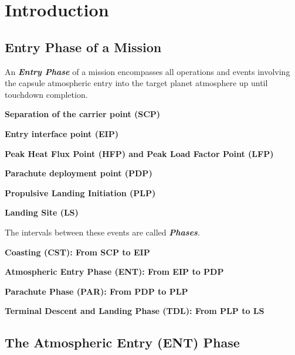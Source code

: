 \chapter{Introduction}

    \section{Entry Phase of a Mission}

        An \textbf{\textit{Entry Phase}} of a mission encompasses all operations and
        events involving the capsule atmospheric entry into the target planet
        atmosphere up until touchdown completion.

        \textbf{Separation of the carrier point (SCP)}

        \textbf{Entry interface point (EIP)}

        \textbf{Peak Heat Flux Point (HFP) and Peak Load Factor Point (LFP)}

        \textbf{Parachute deployment point (PDP)}

        \textbf{Propulsive Landing Initiation (PLP)}

        \textbf{Landing Site (LS)}

        The intervals between these events are called \textbf{\textit{Phases}}.

        \textbf{Coasting (CST): From SCP to EIP}

        \textbf{Atmospheric Entry Phase (ENT): From EIP to PDP}

        \textbf{Parachute Phase (PAR): From PDP to PLP}

        \textbf{Terminal Descent and Landing Phase (TDL): From PLP to LS}

    \section{The Atmospheric Entry (ENT) Phase}
